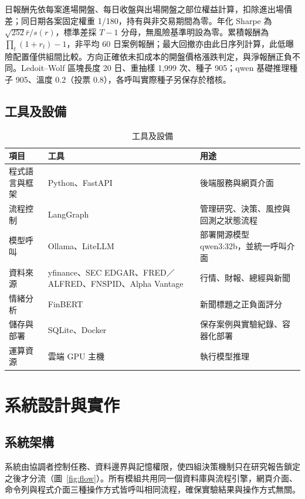 \documentclass[12pt,a4paper]{article}
\begin{document}
\begin{CJK}{UTF8}{bkai}
日報酬先依每案進場開盤、每日收盤與出場開盤之部位權益計算，扣除進出場價差；同日期各案固定權重 1/180，持有與非交易期間為零。年化 Sharpe 為 $\sqrt{252}\bar r/s(r)$，標準差採 $T-1$ 分母，無風險基準明設為零。累積報酬為 $\prod_t(1+r_t)-1$，非平均 60 日案例報酬；最大回撤亦由此日序列計算，此低曝險配置僅供組間比較。方向正確依未扣成本的開盤價格漲跌判定，與淨報酬正負不同。Ledoit--Wolf 區塊長度 20 日、重抽樣 1,999 次、種子 905；qwen 基礎推理種子 905、溫度 0.2（投票 0.8），各呼叫實際種子另保存於稽核。


\subsection{工具及設備}

\begin{table}[H]
\centering\small
\caption{工具及設備}
\label{tab:tools}
\begin{tabularx}{\textwidth}{@{}l Y Y@{}}
\toprule
項目 & 工具 & 用途 \\
\midrule
程式語言與框架 & Python、FastAPI & 後端服務與網頁介面 \\
流程控制 & LangGraph & 管理研究、決策、風控與回測之狀態流程 \\
模型呼叫 & Ollama、LiteLLM & 部署開源模型 qwen3:32b，並統一呼叫介面 \\
資料來源 & yfinance、\allowbreak SEC EDGAR、\allowbreak FRED／ALFRED、\allowbreak FNSPID、\allowbreak Alpha Vantage &行情、財報、總經與新聞 \\
情緒分析 & FinBERT & 新聞標題之正負面評分 \\
儲存與部署 & SQLite、Docker & 保存案例與實驗紀錄、容器化部署 \\
運算資源 & 雲端 GPU 主機 & 執行模型推理 \\
\bottomrule
\end{tabularx}
\end{table}

\section{系統設計與實作}

\subsection{系統架構}

系統由協調者控制任務、資料邊界與記憶權限，使四組決策機制只在研究報告鎖定之後才分流（圖~\ref{fig:flow}）。所有模組共用同一個資料庫與流程引擎，網頁介面、命令列與程式介面三種操作方式皆呼叫相同流程，確保實驗結果與操作方式無關。


\end{CJK}
\end{document}

